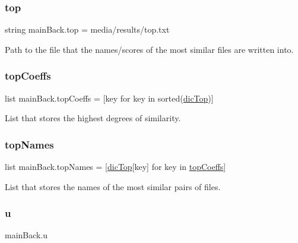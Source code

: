 \subsubsection{\texorpdfstring{top}{top}}
{\footnotesize\ttfamily string main\+Back.\+top = \textquotesingle{}media/results/top.\+txt\textquotesingle{}}



Path to the file that the names/scores of the most similar files are written into. 

\mbox{\label{namespacemain_back_a23114ee3f0a053386332a41a4bfc8107}} 
\subsubsection{\texorpdfstring{top\+Coeffs}{topCoeffs}}
{\footnotesize\ttfamily list main\+Back.\+top\+Coeffs = \mbox{[}key for key in sorted(\hyperlink{namespacemain_back_a14e7fa3decf3555d9fd28beaae5657fc}{dic\+Top})\mbox{]}}



List that stores the highest degrees of similarity. 

\mbox{\label{namespacemain_back_adb3e6c6208b05db53a12bcb112a675b6}} 
\subsubsection{\texorpdfstring{top\+Names}{topNames}}
{\footnotesize\ttfamily list main\+Back.\+top\+Names = \mbox{[}\hyperlink{namespacemain_back_a14e7fa3decf3555d9fd28beaae5657fc}{dic\+Top}\mbox{[}key\mbox{]} for key in \hyperlink{namespacemain_back_a23114ee3f0a053386332a41a4bfc8107}{top\+Coeffs}\mbox{]}}



List that stores the names of the most similar pairs of files. 

\mbox{\label{namespacemain_back_acf43846c5a893d78f9a0e7fccf1ba489}} 
\subsubsection{\texorpdfstring{u}{u}}
{\footnotesize\ttfamily main\+Back.\+u}



